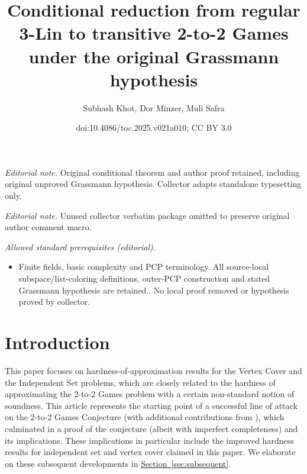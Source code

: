 \documentclass[11pt]{article}
\title{Conditional reduction from regular 3-Lin to transitive 2-to-2 Games under the original Grassmann hypothesis}
\author{Subhash Khot, Dor Minzer, Muli Safra}
\date{doi:10.4086/toc.2025.v021a010; CC BY 3.0}
\numberwithin{equation}{section}
\theoremstyle{definition}
\theoremstyle{plain}
\newcommand{\expref}[2]{\hyperref[#2]{#1~\ref{#2}}}
\begin{document}
\maketitle
\noindent\textit{Editorial note.} Original conditional theorem and author proof retained, including original unproved Grassmann hypothesis. Collector adapts standalone typesetting only.\par\medskip
\noindent\textit{Editorial note.} Unused collector verbatim package omitted to preserve original author comment macro.\par\medskip
\noindent\textit{Allowed standard prerequisites (editorial).}\begin{itemize}
\item Finite fields, basic complexity and PCP terminology. All source-local subspace/list-coloring definitions, outer-PCP construction and stated Grassmann hypothesis are retained.. No local proof removed or hypothesis proved by collector.
\end{itemize}\medskip
\section{Introduction}

This paper %
focuses  %
on hardness-of-approximation results for the Vertex Cover and the Independent Set problems, which are closely related to
the hardness of approximating the $2$-to-$2$ Games problem with a certain non-standard notion of soundness.
This %
article  %
represents the starting point of a successful line of attack on the $2$-to-$2$ Games Conjecture %
\cite{conf-version,DKKMS1,DKKMS2,KMS2} %
(with additional contributions from \cite{KS,KMMS,BKS}),
which culminated in a proof of the conjecture (albeit with imperfect completeness) and its implications. These implications in particular include the improved hardness results
for independent set and vertex cover claimed in this paper. We elaborate on these subsequent developments in \expref{Section}{sec:subsequent}.
\end{document}
